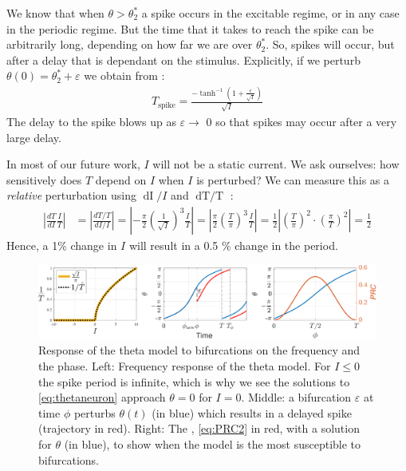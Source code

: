 We know that when $\theta > \theta^{\ast}_{2}$ a spike occurs in the excitable regime, or in any case in the periodic regime. But the time that it takes to reach the spike can be arbitrarily long, depending on how far we are over $\theta^{\ast}_{2}$. So, spikes will occur, but after a delay that is dependant on the stimulus. Explicitly, if we perturb $\theta(0) = \theta^{\ast}_{2} + \varepsilon$ we obtain from \cite{Gutkin2014}:
\begin{align*}
T_{\text {spike}} = \frac{-\tanh ^{-1}\left(1+\frac{\epsilon}{\sqrt{I}}\right)}{\sqrt{I}}
\end{align*}
The delay to the spike blows up as $\varepsilon \rightarrow$ 0 so that spikes may occur after a very large delay.

In most of our future work, $I$ will not be a static current. We ask ourselves: how sensitively does $T$ depend on $I$ when $I$ is perturbed? We can measure this as a \textsl{relative} perturbation using $\mathop{dI}/I$ and $\mathop{dT/T}$ \cite{IntroductionModelingDynamics} :
\begin{align*}
\left| \frac{dT}{dI} \frac{I}{T} \right| &= \left| \frac{dT / T}{dI / I}\right| 
= \left|- \frac{\pi}{2} \left(\frac{1}{\sqrt{I}}\right)^3 \frac{I}{T} \right| 
= \left| \frac{\pi}{2} \left(\frac{T}{\pi}\right)^3 \frac{I}{T} \right| 
= \frac{1}{2} \left|\left(\frac{T}{\pi}\right)^2 \cdot \left(\frac{\pi}{T}\right)^2 \right| = \frac{1}{2}
\end{align*}
Hence, a 1\% change in $I$ will result in a 0.5 \% change in the period.

\begin{figure}[H]
\centering
\includegraphics[width = \textwidth]{../Figures/ThetaNeuronfIandPRC.pdf}
\caption{Response of the theta model to bifurcations on the frequency and the phase. Left: Frequency response of the theta model. For $I \leq 0$ the spike period is infinite, which is why we see the solutions to \eqref{eq:thetaneuron} approach $\theta = 0$ for $I = 0$. Middle: a bifurcation $\varepsilon$ at time $\phi$ perturbs $\theta(t)$ (in blue) which results in a delayed spike (trajectory in red). Right: The \PRC, \eqref{eq:PRC2} in red, with a solution for $\theta$ (in blue), to show when the model is the most susceptible to bifurcations.}
\label{fig:ThetaNeuronfIandPRC}
\end{figure}

